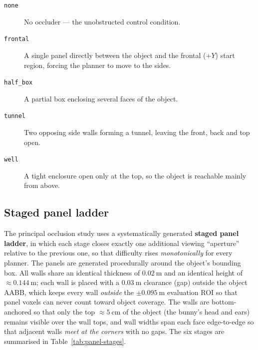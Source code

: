 \begin{description}
  \item[\texttt{none}] No occluder --- the unobstructed control condition.
  \item[\texttt{frontal}] A single panel directly between the object and the
        frontal ($+Y$) start region, forcing the planner to move to the
        sides.
  \item[\texttt{half\_box}] A partial box enclosing several faces of the
        object.
  \item[\texttt{tunnel}] Two opposing side walls forming a tunnel, leaving
        the front, back and top open.
  \item[\texttt{well}] A tight enclosure open only at the top, so the object
        is reachable mainly from above.
\end{description}

\subsection{Staged panel ladder}
\label{sec:panels}

The principal occlusion study uses a systematically generated
\textbf{staged panel ladder}, in which each stage closes exactly one
additional viewing ``aperture'' relative to the previous one, so that
difficulty rises \emph{monotonically} for every planner. The panels are
generated procedurally around the object's bounding box. All walls share an
identical thickness of $\SI{0.02}{\meter}$ and an identical height of
$\approx\SI{0.144}{\meter}$; each wall is placed with a $\SI{0.03}{\meter}$
clearance (gap) outside the object AABB, which keeps every wall
\emph{outside} the $\pm\SI{0.095}{\meter}$ evaluation ROI so that panel
voxels can never count toward object coverage. The walls are
bottom-anchored so that only the top $\approx\SI{5}{\centi\meter}$ of the
object (the bunny's head and ears) remains visible over the wall tops, and
wall widths span each face edge-to-edge so that adjacent walls \emph{meet at
the corners} with no gaps. The six stages are summarised in
Table~\ref{tab:panel-stages}.

